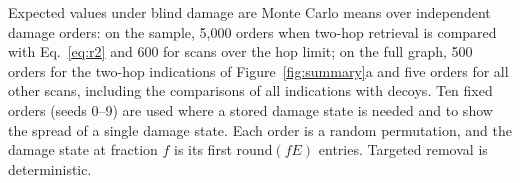 Expected values under blind damage are Monte Carlo means over independent damage
orders: on the sample, 5,000 orders when two-hop retrieval is compared with
Eq.~\eqref{eq:r2} and 600 for scans over the hop limit; on the full graph, 500
orders for the two-hop indications of Figure~\ref{fig:summary}a and five orders
for all other scans, including the comparisons of all indications with decoys. Ten fixed orders (seeds 0--9) are used
where a stored damage state is needed and to show the spread of a single damage
state. Each order is a random permutation, and the damage state at fraction $f$
is its first $\mathrm{round}(fE)$ entries. Targeted removal is deterministic.
